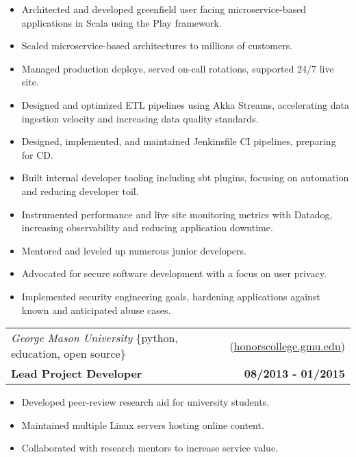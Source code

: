 \documentclass[10pt,letterpaper]{article}
\begin{document}
\begin{itemize}
\item Architected and developed greenfield user facing microservice-based applications \linebreak in Scala using the Play framework.
\item Scaled microservice-based architectures to millions of customers.
\item Managed production deploys, served on-call rotations, supported 24/7 live site.
\item Designed and optimized ETL pipelines using Akka Streams, accelerating data ingestion \linebreak velocity and increasing data quality standards.
\item Designed, implemented, and maintained Jenkinsfile CI pipelines, preparing for CD.
\item Built internal developer tooling including sbt plugins, focusing on automation \linebreak and reducing developer toil.
\item Instrumented performance and live site monitoring metrics with Datadog, increasing \linebreak observability and reducing application downtime.
\item Mentored and leveled up numerous junior developers.
\item Advocated for secure software development with a focus on user privacy.
\item Implemented security engineering goals, hardening applications against known and \linebreak anticipated abuse cases.
\end{itemize}

\vspace{0.25cm}

\noindent\begin{tabularx}{\textwidth}{@{} Xr @{}}
  \textit{George Mason University} \{python, education, open source\} & (\href{https://honorscollege.gmu.edu}{honorscollege.gmu.edu}) \\
  \textbf{Lead Project Developer} & \textbf{08/2013 - 01/2015}
\end{tabularx}

\begin{itemize}
\item Developed peer-review research aid for university students.
\item Maintained multiple Linux servers hosting online content.
\item Collaborated with research mentors to increase service value.
\end{itemize}
\end{document}
